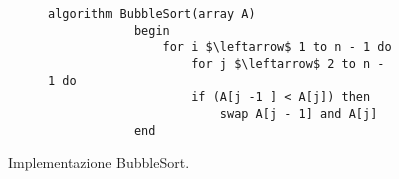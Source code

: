 \documentclass{subfiles}
\begin{document}
\begin{figure*}[!h]
    \centering
    \begin{subfigure}[b]{0.5\textwidth}
        \begin{lstlisting}[language = algol]
            algorithm BubbleSort(array A)
            begin
                for i $\leftarrow$ 1 to n - 1 do
                    for j $\leftarrow$ 2 to n - 1 do
                    if (A[j -1 ] < A[j]) then
                        swap A[j - 1] and A[j]
            end
        \end{lstlisting}
    \end{subfigure}
    \caption{Implementazione BubbleSort.}
\end{figure*}
\end{document}
